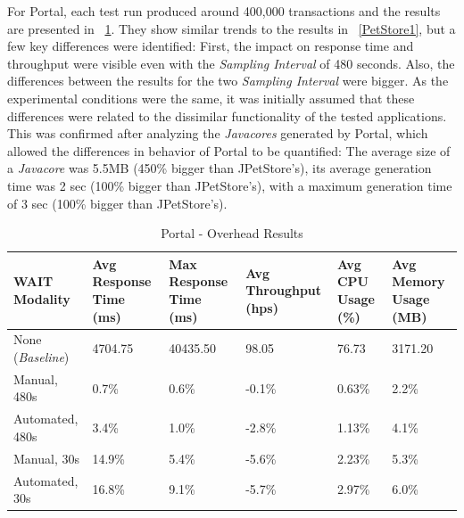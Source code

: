 \documentclass[runningheads,a4paper]{llncs}
\begin{document}
For Portal, each test run produced around 400,000 transactions and the
results are presented in \tablename ~\ref{Portal1}. They show similar trends
to the results in \tablename ~\ref{PetStore1}, but a few
key differences were identified: First, the impact on response time and
throughput were visible even with the \emph{Sampling Interval} of 480 seconds.
Also, the differences between the results for the two \emph{Sampling Interval}
were bigger. As the experimental conditions were the same, it was initially
assumed that these differences were related to the dissimilar functionality of the 
tested applications. This was confirmed after analyzing the \emph{Javacores} generated 
by Portal, which allowed the differences in behavior of Portal to be quantified:
The average size of a \emph{Javacore} was 5.5MB (450\% bigger than JPetStore's), its 
average generation time was 2 sec (100\% bigger than JPetStore's), with a maximum 
generation time of 3 sec (100\% bigger than JPetStore's).

\begin{table}[!h]
\caption{Portal - Overhead Results}
\label{Portal1}
\centering
\begin{tabular}{p{}|p{}|p{}|p{}|p{}|p{}}
\hline
\bfseries WAIT Modality & \bfseries Avg Response Time (ms)& \bfseries Max
Response Time (ms)& \bfseries Avg Throughput (hps)& \bfseries Avg CPU Usage
(\%) & \bfseries Avg Memory Usage (MB)\\
\hline
None (\emph{Baseline}) 	& 4704.75	& 40435.50	& 98.05 	& 76.73 	& 3171.20\\
Manual, 480s 			& 0.7\% 	& 0.6\%		& -0.1\%	& 0.63\% 	& 2.2\%\\
Automated, 480s 		& 3.4\%		& 1.0\%		& -2.8\% 	& 1.13\% 	& 4.1\%\\
Manual, 30s 			& 14.9\%	& 5.4\%		& -5.6\% 	& 2.23\% 	& 5.3\%\\
Automated, 30s 			& 16.8\%	& 9.1\%		& -5.7\% 	& 2.97\% 	& 6.0\%\\
\hline
\end{tabular}
\end{table}


\end{document}
